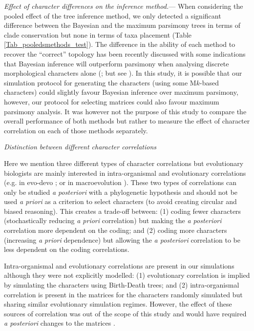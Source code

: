 \documentclass[12pt,letterpaper]{article}
\renewcommand{\subsection}[1]{%
\bigskip
\begin{center}
\begin{large}
\normalfont\itshape #1
\end{large}
\end{center}}
\renewcommand{\subsubsection}[1]{%
\vspace{2ex}
\noindent
\textit{#1.}---}
\begin{document}
\subsubsection{Effect of character differences on the inference method}
When considering the pooled effect of the tree inference method, we only detected a significant difference between the Bayesian and the maximum parsimony trees in terms of clade conservation but none in terms of taxa placement (Table \ref{Tab_pooledsmethods_test}).
The difference in the ability of each method to recover the ``correct'' topology has been recently discussed with some indications that Bayesian inference will outperform parsimony when analysing discrete morphological characters alone (\citealt{wrightbayesian2014,OReilly20160081,puttick2017uncertain}; but see \citealt{spencerefficacy2013,goloboff2017weighted}).
In this study, it is possible that our simulation protocol for generating the characters (using some M$k$-based characters) could slightly favour Bayesian inference over maximum parsimony, however, our protocol for selecting matrices \citep[using matrices with a $CI>0.26$;][]{OReilly20160081} could also favour maximum parsimony analysis.
It was however not the purpose of this study to compare the overall performance of both methods but rather to measure the effect of character correlation on each of those methods separately.

\subsection{Distinction between different character correlations}
Here we mention three different types of character correlations but evolutionary biologists are mainly interested in intra-organismal and evolutionary correlations (e.g. in evo-devo \citealt{goswami2006morphological}; or in macroevolution \citealt{fitzjohn2014much}).
These two types of correlations can only be studied \textit{a posteriori} with a phylogenetic hypothesis and should not be used \textit{a priori} as a criterion to select characters (to avoid creating circular and biased reasoning).
This creates a trade-off between: (1) coding fewer characters (stochastically reducing \textit{a priori} correlation) but making the \textit{a posteriori} correlation more dependent on the coding;
and (2) coding more characters (increasing \textit{a priori} dependence) but allowing the \textit{a posteriori} correlation to be less dependent on the coding correlations.

Intra-organismal and evolutionary correlations are present in our simulations although they were not explicitly modelled:
(1) evolutionary correlation is implied by simulating the characters using Birth-Death trees;
and (2) intra-organismal correlation is present in the matrices for the characters randomly simulated but sharing similar evolutionary simulation regimes.
However, the effect of these sources of correlation was out of the scope of this study and would have required \textit{a posteriori} changes to the matrices \citep{Lande1983,Maddison1990,Pagel1994}.
\end{document}

